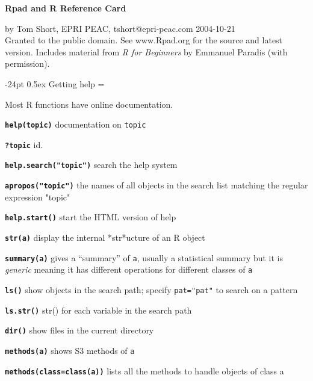\documentclass[10pt,landscape]{article}
\makeatletter
\renewcommand\section{\@startsection{section}{1}{0mm}%
                                     {-24pt}%
                                     {0.5ex}%
                                {\color{blue}\normalfont\large\bfseries}}
\newcommand{\code}{\texttt}
\newcommand{\bcode}[1]{\texttt{\textbf{#1}}}
\makeatother
\begin{document}
\footnotesize
\begin{multicols}{3}

\setlength{\premulticols}{1pt}
\setlength{\postmulticols}{1pt}
\setlength{\multicolsep}{1pt}
\setlength{\columnsep}{2pt}

\begin{center}
     \Large{\textbf{\color{blue}Rpad and R Reference Card}} \\
\end{center}

by Tom Short, EPRI PEAC, tshort@epri-peac.com    2004-10-21\\
Granted to the public domain. See www.Rpad.org for the source and latest version.
Includes material from \emph{R for Beginners} by Emmanuel Paradis (with permission).



\section{Getting help}
\everypar={\hangindent=9mm}

Most R functions have online documentation.

\bcode{help(topic)} documentation on \code{topic}

\bcode{?topic} id.

\bcode{help.search("topic")} search the help system 

\bcode{apropos("topic")} the names of all objects in the search list
matching the regular expression "topic"

\bcode{help.start()} start the HTML version of help

\bcode{str(a)} display the internal *str*ucture of an R object

\bcode{summary(a)} gives a ``summary'' of \code{a}, usually a
statistical summary but it is \emph{generic} meaning it has different operations for different
classes of \code{a}

\bcode{ls()} show objects in the search path; specify \code{pat="pat"}
to search on a pattern

\bcode{ls.str()} str() for each variable in the search path

\bcode{dir()} show files in the current directory

\bcode{methods(a)} shows S3 methods of \code{a}

\bcode{methods(class=class(a))} lists all the methods to handle objects
of class a





\end{multicols}
\end{document}
